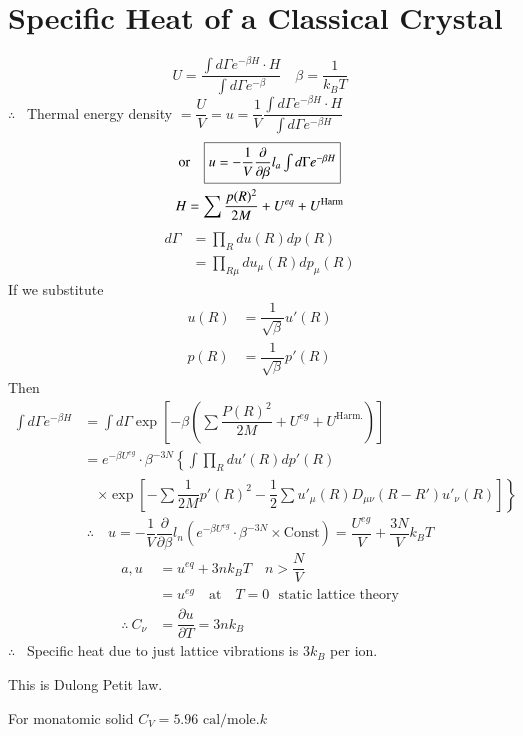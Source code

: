 \section*{Specific Heat of a Classical Crystal}
$$
U=\dfrac{\int d\Gamma e^{-\beta H}\cdot H}{\int d\Gamma e^{-\beta}}\quad \beta=\dfrac{1}{k_{B}T}
$$
$\therefore$ \ Thermal energy density $=\dfrac{U}{V}=u=\dfrac{1}{V}\dfrac{\int d\Gamma e^{-\beta H}\cdot H}{\int d\Gamma e^{-\beta H}}$
\begin{gather*}
\text{or}\quad \fbox{$u=-\dfrac{1}{V}\dfrac{\partial}{\partial\beta} l_{a}\int d\Gamma e^{-\beta H}$}\\
H= \sum \dfrac{p(R)^{2}}{2M}+U^{eq}+U^{\text{Harm}}
\end{gather*}
\begin{align*}
d\Gamma &= \prod\limits_{R}du(R)dp(R)\\
&= \prod\limits_{R\mu}du_{\mu}(R)dp_{\mu}(R)
\end{align*}
If we substitute
\begin{align*}
u(R) &= \dfrac{1}{\sqrt{\beta}}u'(R)\\
p(R) &= \dfrac{1}{\sqrt{\beta}}p'(R)
\end{align*}
Then
\begin{align*}
\int d\Gamma e^{-\beta H} &= \int d\Gamma \exp \left[-\beta\left(\sum \dfrac{P(R)^{2}}{2M}+U^{eg}+U^{\text{Harm.}}\right)\right]\\
&= e^{-\beta U^{eg}}\cdot \beta^{-3N}\left\{\int\prod\limits_{R}du'(R)dp'(R)\right.\\
&\quad \left.\times \exp \left[-\sum \dfrac{1}{2M}p'(R)^{2}-\dfrac{1}{2}\sum u'_{\mu}(R)D_{\mu\nu}(R-R')u'_{\nu}(R)\right]\right\}
\end{align*}
$$
\therefore\quad u=-\dfrac{1}{V}\dfrac{\partial}{\partial\beta}l_{n}\left(e^{-\beta U^{eg}}\cdot \beta^{-3N}\times \text{Const}\right)=\dfrac{U^{eg}}{V}+\dfrac{3N}{V}k_{B}T
$$
\begin{align*}
a, u &= u^{eq}+3nk_{B}T\quad n>\dfrac{N}{V}\\
&= u^{eg}\quad\text{at}\quad T=0\text{~ static lattice theory}\\
\therefore \ C_{\nu} &= \dfrac{\partial u}{\partial T}=3nk_{B}
\end{align*}
$\therefore$ \ Specific heat due to just lattice vibrations is $3k_{B}$ per ion.

This is Dulong Petit law.

For monatomic solid $C_{V}=5.96 \text{ cal/mole.}k$

